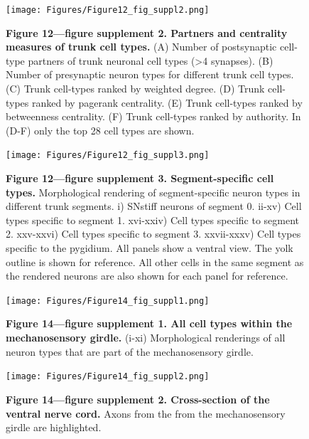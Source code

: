 \documentclass[
  11pt,
]{article}
\begin{document}
\begin{figure}[H]

{\centering \texttt{[image: Figures/Figure12\_fig\_suppl2.png]}

}

\caption{\textbf{Figure 12---figure supplement 2. Partners and
centrality measures of trunk cell types.} (A) Number of postsynaptic
cell-type partners of trunk neuronal cell types (\textgreater4
synapses). (B) Number of presynaptic neuron types for different trunk
cell types. (C) Trunk cell-types ranked by weighted degree. (D) Trunk
cell-types ranked by pagerank centrality. (E) Trunk cell-types ranked by
betweenness centrality. (F) Trunk cell-types ranked by authority. In
(D-F) only the top 28 cell types are shown.}

\end{figure}%

\begin{figure}[H]

{\centering \texttt{[image: Figures/Figure12\_fig\_suppl3.png]}

}

\caption{\textbf{Figure 12---figure supplement 3. Segment-specific cell
types. } Morphological rendering of segment-specific neuron types in
different trunk segments. i) SNstiff neurons of segment 0. ii-xv) Cell
types specific to segment 1. xvi-xxiv) Cell types specific to segment 2.
xxv-xxvi) Cell types specific to segment 3. xxvii-xxxv) Cell types
specific to the pygidium. All panels show a ventral view. The yolk
outline is shown for reference. All other cells in the same segment as
the rendered neurons are also shown for each panel for reference.}

\end{figure}%

\begin{figure}[H]

{\centering \texttt{[image: Figures/Figure14\_fig\_suppl1.png]}

}

\caption{\textbf{Figure 14---figure supplement 1. All cell types within
the mechanosensory girdle. } (i-xi) Morphological renderings of all
neuron types that are part of the mechanosensory girdle.}

\end{figure}%

\begin{figure}[H]

{\centering \texttt{[image: Figures/Figure14\_fig\_suppl2.png]}

}

\caption{\textbf{Figure 14---figure supplement 2. Cross-section of the
ventral nerve cord. } Axons from the from the mechanosensory girdle are
highlighted.}

\end{figure}%
\end{document}
